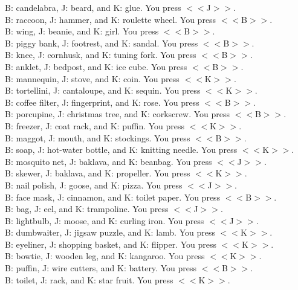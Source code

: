 \documentclass[pdflatex,sn-nature]{sn-jnl}%
\theoremstyle{thmstyleone}%
\theoremstyle{thmstyletwo}%
\theoremstyle{thmstylethree}%
\begin{document}
B: candelabra, J: beard, and K: glue. You press $<<$J$>>$. $~$\\ 
B: raccoon, J: hammer, and K: roulette wheel. You press $<<$B$>>$. $~$\\ 
B: wing, J: beanie, and K: girl. You press $<<$B$>>$. $~$\\ 
B: piggy bank, J: footrest, and K: sandal. You press $<<$B$>>$. $~$\\ 
B: knee, J: cornhusk, and K: tuning fork. You press $<<$B$>>$. $~$\\ 
B: anklet, J: bedpost, and K: ice cube. You press $<<$B$>>$. $~$\\ 
B: mannequin, J: stove, and K: coin. You press $<<$K$>>$. $~$\\ 
B: tortellini, J: cantaloupe, and K: sequin. You press $<<$K$>>$. $~$\\ 
B: coffee filter, J: fingerprint, and K: rose. You press $<<$B$>>$. $~$\\ 
B: porcupine, J: christmas tree, and K: corkscrew. You press $<<$B$>>$. $~$\\ 
B: freezer, J: coat rack, and K: puffin. You press $<<$K$>>$. $~$\\ 
B: maggot, J: mouth, and K: stockings. You press $<<$B$>>$. $~$\\ 
B: soap, J: hot-water bottle, and K: knitting needle. You press $<<$K$>>$. $~$\\ 
B: mosquito net, J: baklava, and K: beanbag. You press $<<$J$>>$. $~$\\ 
B: skewer, J: baklava, and K: propeller. You press $<<$K$>>$. $~$\\ 
B: nail polish, J: goose, and K: pizza. You press $<<$J$>>$. $~$\\ 
B: face mask, J: cinnamon, and K: toilet paper. You press $<<$B$>>$. $~$\\ 
B: bag, J: eel, and K: trampoline. You press $<<$J$>>$. $~$\\ 
B: lightbulb, J: moose, and K: curling iron. You press $<<$J$>>$. $~$\\ 
B: dumbwaiter, J: jigsaw puzzle, and K: lamb. You press $<<$K$>>$. $~$\\ 
B: eyeliner, J: shopping basket, and K: flipper. You press $<<$K$>>$. $~$\\ 
B: bowtie, J: wooden leg, and K: kangaroo. You press $<<$K$>>$. $~$\\ 
B: puffin, J: wire cutters, and K: battery. You press $<<$B$>>$. $~$\\ 
B: toilet, J: rack, and K: star fruit. You press $<<$K$>>$. $~$\\ 
\end{document}
